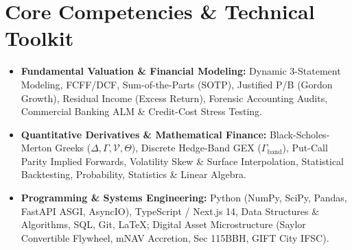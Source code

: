 \documentclass[10pt,a4paper]{article}
\begin{document}
\section{Core Competencies \& Technical Toolkit}
\begin{itemize}[leftmargin=1.2em,itemsep=1.5pt,topsep=1.5pt]
  \item \small \textbf{Fundamental Valuation \& Financial Modeling:} Dynamic 3-Statement Modeling, FCFF/DCF, Sum-of-the-Parts (SOTP), Justified P/B (Gordon Growth), Residual Income (Excess Return), Forensic Accounting Audits, Commercial Banking ALM \& Credit-Cost Stress Testing.
  \item \small \textbf{Quantitative Derivatives \& Mathematical Finance:} Black-Scholes-Merton Greeks ($\Delta, \Gamma, \mathcal{V}, \Theta$), Discrete Hedge-Band GEX ($\Gamma_{\mathrm{band}}$), Put-Call Parity Implied Forwards, Volatility Skew \& Surface Interpolation, Statistical Backtesting, Probability, Statistics \& Linear Algebra.
  \item \small \textbf{Programming \& Systems Engineering:} Python (NumPy, SciPy, Pandas, FastAPI ASGI, AsyncIO), TypeScript / Next.js 14, Data Structures \& Algorithms, SQL, Git, LaTeX; Digital Asset Microstructure (Saylor Convertible Flywheel, mNAV Accretion, Sec 115BBH, GIFT City IFSC).
\end{itemize}
\end{document}
